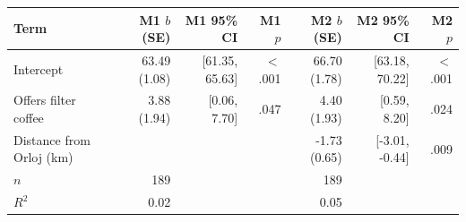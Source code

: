 \begin{tabular}{lrrrrrr}
\toprule
Term & M1 $b$ (SE) & M1 95\% CI & M1 $p$ & M2 $b$ (SE) & M2 95\% CI & M2 $p$ \\
\midrule
Intercept & 63.49 (1.08) & [61.35, 65.63] & $<$.001 & 66.70 (1.78) & [63.18, 70.22] & $<$.001 \\
Offers filter coffee & 3.88 (1.94) & [0.06, 7.70] & .047 & 4.40 (1.93) & [0.59, 8.20] & .024 \\
Distance from Orloj (km) &  &  &  & -1.73 (0.65) & [-3.01, -0.44] & .009 \\
$n$ & 189 &  &  & 189 &  &  \\
$R^2$ & 0.02 &  &  & 0.05 &  &  \\
\bottomrule
\end{tabular}
